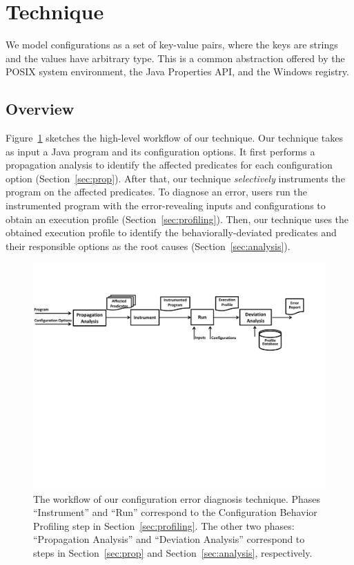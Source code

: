 \section{Technique}
\label{sec:technique}

We model configurations as a set of key-value pairs, where
the keys are strings and the values have arbitrary type. This is
a common abstraction offered
by the POSIX system environment, the Java Properties API,
and the Windows registry.


\subsection{Overview}

Figure~\ref{fig:workflow} sketches the high-level workflow of our technique.
Our technique takes as input a Java program and its configuration options.
It first performs a propagation analysis to identify
the affected predicates for each configuration option (Section~\ref{sec:prop}).
After that, our technique \textit{selectively} instruments
the program on the affected predicates. 
To diagnose an error, users run the instrumented program
with the error-revealing inputs and configurations
 to obtain an execution
profile (Section~\ref{sec:profiling}).
Then, our technique uses the obtained execution profile
to identify the behaviorally-deviated predicates and their
responsible options as the root causes (Section~\ref{sec:analysis}).




\begin{figure}[!]
  \centering
  \includegraphics[scale=0.600]{architecture}
  \vspace*{-2.0ex}\caption {{\label{fig:workflow} The workflow of our configuration error diagnosis technique.
Phases ``Instrument'' and ``Run'' correspond to the Configuration Behavior Profiling step in Section~\ref{sec:profiling}.
The other two phases: ``Propagation Analysis'' and ``Deviation Analysis'' correspond to steps in Section~\ref{sec:prop} and Section~\ref{sec:analysis}, respectively.
}}
\end{figure}

